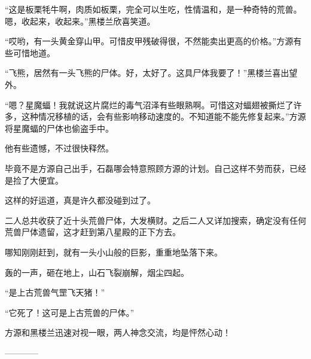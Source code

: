 \begin{this_body}
“这是板栗牦牛啊，肉质如板栗，完全可以生吃，性情温和，是一种奇特的荒兽。嗯，收起来，收起来。”黑楼兰欣喜笑道。

“哎哟，有一头黄金穿山甲。可惜皮甲残破得很，不然能卖出更高的价格。”方源有些可惜地道。

“飞熊，居然有一头飞熊的尸体。好，太好了。这具尸体我要了！”黑楼兰喜出望外。

“嗯？星魔蝠！我就说这片腐烂的毒气沼泽有些眼熟啊。可惜这对蝠翅被撕烂了许多，这种情况移植的话，会有些影响移动速度的。不知道能不能先修复起来。”方源将星魔蝠的尸体也偷盗手中。

他有些遗憾，不过很快释然。

毕竟不是方源自己出手，石磊哪会特意照顾方源的计划。自己这样不劳而获，已经是捡了大便宜。

这样的好运道，真是许久都没碰到过了。

二人总共收获了近十头荒兽尸体，大发横财。之后二人又详加搜索，确定没有任何荒兽尸体遗留，这才赶到第八星殿的正下方去。

哪知刚刚赶到，就有一头小山般的巨影，重重地坠落下来。

轰的一声，砸在地上，山石飞裂崩解，烟尘四起。

“是上古荒兽气罡飞天猪！”

“它死了！这可是上古荒兽的尸体。”

方源和黑楼兰迅速对视一眼，两人神念交流，均是怦然心动！

------------

\end{this_body}

